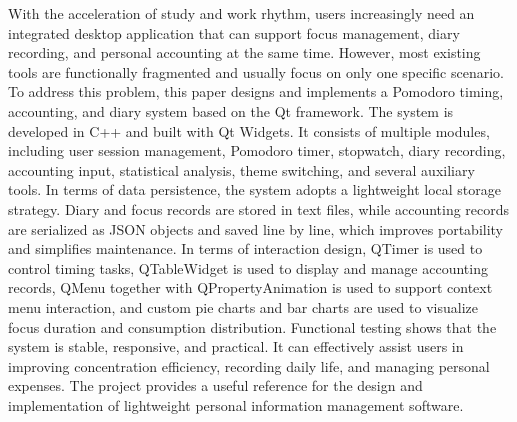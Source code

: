 

\begin{abstract}
  随着学习、工作节奏的不断加快，用户对时间管理、日常记录和个人财务管理的需求日益增长，但现有软件大多功能单一、平台割裂，难以同时满足专注计时、过程留痕和消费统计等综合需求。针对上述问题，本文结合当前已完成的项目，设计并实现了一套基于Qt框架的番茄计时与记账日记系统。系统采用C++作为开发语言，以Qt Widgets构建桌面图形界面，整体由登录会话、番茄计时、正向计时、日记记录、记账录入、数据统计、主题切换及扩展工具等模块组成。在数据管理方面，系统采用本地文件持久化策略：日记与专注记录以文本形式进行存储，记账数据采用JSON对象逐行写入的方式保存，从而兼顾实现成本、可读性与维护便利性。在功能实现方面，系统利用QTimer完成番茄计时与正向计时逻辑，利用QTableWidget完成账单展示与编辑，利用QMenu和QPropertyAnimation实现右键菜单及动画交互，利用自定义绘制的饼状图和柱状图对消费类型、周月专注时长及账单统计结果进行可视化表达。测试结果表明，该系统界面响应及时、功能运行稳定、数据读写正确，能够较好地满足个人用户在专注管理、日常记录与基础财务分析方面的实际需要。本文的研究与实现对于轻量级个人信息管理软件的开发具有一定的工程参考价值。

\end{abstract}

\begin{abstract*}
  With the acceleration of study and work rhythm, users increasingly need an integrated desktop application that can support focus management, diary recording, and personal accounting at the same time. However, most existing tools are functionally fragmented and usually focus on only one specific scenario. To address this problem, this paper designs and implements a Pomodoro timing, accounting, and diary system based on the Qt framework. The system is developed in C++ and built with Qt Widgets. It consists of multiple modules, including user session management, Pomodoro timer, stopwatch, diary recording, accounting input, statistical analysis, theme switching, and several auxiliary tools. In terms of data persistence, the system adopts a lightweight local storage strategy. Diary and focus records are stored in text files, while accounting records are serialized as JSON objects and saved line by line, which improves portability and simplifies maintenance. In terms of interaction design, QTimer is used to control timing tasks, QTableWidget is used to display and manage accounting records, QMenu together with QPropertyAnimation is used to support context menu interaction, and custom pie charts and bar charts are used to visualize focus duration and consumption distribution. Functional testing shows that the system is stable, responsive, and practical. It can effectively assist users in improving concentration efficiency, recording daily life, and managing personal expenses. The project provides a useful reference for the design and implementation of lightweight personal information management software.

\end{abstract*}
